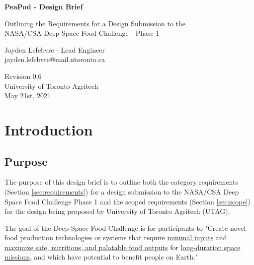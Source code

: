 \documentclass{report}
\begin{document}
\begin{titlepage}
    \begin{center}
        \vspace*{1.2cm}

        \textbf{\large{PeaPod - Design Brief}}

        \vspace{0.5cm}

        Outlining the Requirements for a Design Submission to the \\NASA/CSA Deep Space Food Challenge - Phase 1

        \vfill

        Jayden Lefebvre - Lead Engineer\\\small{jayden.lefebvre@mail.utoronto.ca}

        \vspace{2.5cm}

        Revision 0.6\\
        University of Toronto Agritech\\
        May 21st, 2021

    \end{center}
\end{titlepage}

\thispagestyle{plain}

\tableofcontents
\newpage

\section{Introduction}
\label{sec:intro}

\subsection{Purpose}
\label{sec:purpose}

The purpose of this design brief is to outline both the category requirements (Section \ref{sec:requirements}) for a design submission to the NASA/CSA Deep Space Food Challenge Phase 1 \cite{dsfc} and the scoped requirements (Section \ref{sec:scope}) for the design being proposed by University of Toronto Agritech (UTAG).

The goal of the Deep Space Food Challenge is for participants to "Create novel food production technologies or systems that require \uline{minimal inputs} and \uline{maximize safe, nutritious, and palatable food outputs} for \uline{long-duration space missions}, and which have potential to benefit people on Earth." \cite{applicantguide}
\end{document}
